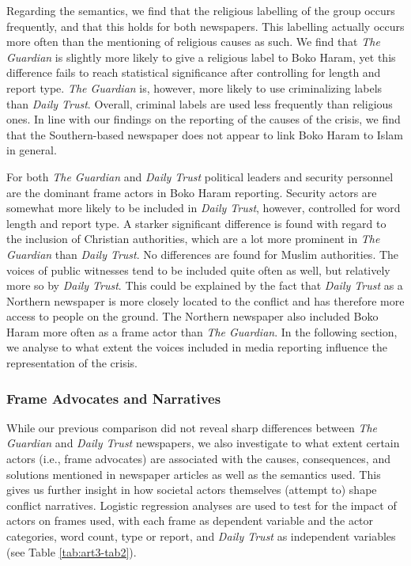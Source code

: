Regarding the semantics, we find that the religious labelling of the group occurs frequently, and that this holds for both newspapers. This labelling actually occurs more often than the mentioning of religious causes as such. We find that \textit{The Guardian} is slightly more likely to give a religious label to Boko Haram, yet this difference fails to reach statistical significance after controlling for length and report type. \textit{The Guardian} is, however, more likely to use criminalizing labels than \textit{Daily Trust}. Overall, criminal labels are used less frequently than religious ones. In line with our findings on the reporting of the causes of the crisis, we find that the Southern-based newspaper does not appear to link Boko Haram to Islam in general.


For both \textit{The Guardian} and \textit{Daily Trust }political leaders and security personnel are the dominant frame actors in Boko Haram reporting. Security actors are somewhat more likely to be included in \textit{Daily Trust}, however, controlled for word length and report type. A starker significant difference is found with regard to the inclusion of Christian authorities, which are a lot more prominent in \textit{The Guardian} than \textit{Daily Trust}. No differences are found for Muslim authorities. The voices of public witnesses tend to be included quite often as well, but relatively more so by \textit{Daily Trust}. This could be explained by the fact that \textit{Daily Trust }as a Northern newspaper is more closely located to the conflict and has therefore more access to people on the ground. The Northern newspaper also included Boko Haram more often as a frame actor than \textit{The Guardian}. In the following section, we analyse to what extent the voices included in media reporting influence the representation of the crisis.


\subsubsection{Frame Advocates and Narratives}

While our previous comparison did not reveal sharp differences between \textit{The Guardian} and \textit{Daily Trust} newspapers, we also investigate to what extent certain actors (i.e., frame advocates) are associated with the causes, consequences, and solutions mentioned in newspaper articles as well as the semantics used. This gives us further insight in how societal actors themselves (attempt to) shape conflict narratives. Logistic regression analyses are used to test for the impact of actors on frames used, with each frame as dependent variable and the actor categories, word count, type or report, and \textit{Daily Trust} as independent variables (see Table \ref{tab:art3-tab2}).


